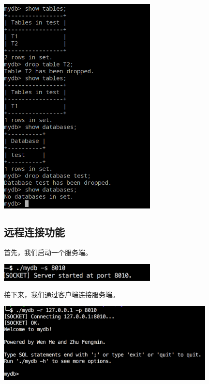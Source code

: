 \documentclass[11pt, a4paper]{article}
\makeatletter
\newcommand\fcaption{\def\@captype{figure}\caption}
\makeatother
\begin{document}
\begin{center}
    \includegraphics[width=8cm]{fig/drop-db}
    \fcaption{删除表及数据库}
\end{center}

\subsection{远程连接功能}

首先，我们启动一个服务端。

\begin{center}
    \includegraphics[width=8cm]{fig/server}
    \fcaption{启动服务端}
\end{center}

接下来，我们通过客户端连接服务端。

\begin{center}
    \includegraphics[width=11cm]{fig/conn}
    \fcaption{客户端连接服务端}
\end{center}
\end{document}
